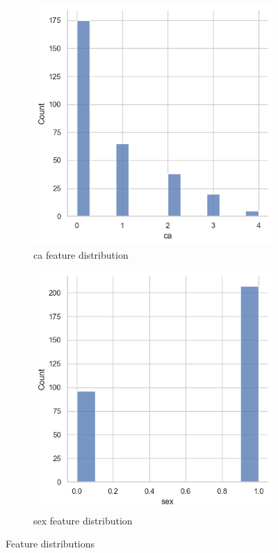 \documentclass{article}
\begin{document}
\begin{enumerate}[leftmargin=\labelsep]
\begin{figure}[H]
\begin{subfigure}{0.3\linewidth}
        \includegraphics[width=\linewidth]{img/ca_distrib.png}
        \caption{ca feature distribution}
        \label{fig:ca}
    \end{subfigure}
    \hfill %
    \begin{subfigure}{0.3\linewidth}
        \centering
        \includegraphics[width=\linewidth]{img/sex_distrib.png}
        \caption{sex feature distribution}
        \label{fig:sex}
    \end{subfigure}
    \caption{Feature distributions}
    \label{fig:distributions}
\end{figure}



\end{enumerate}
\end{document}
